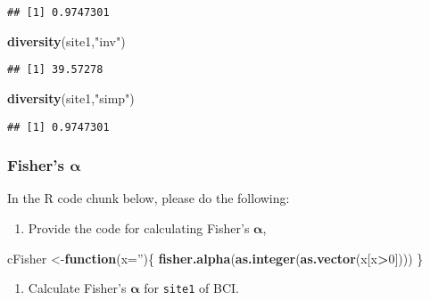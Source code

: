 \documentclass[
]{article}
\newenvironment{Shaded}{\begin{snugshade}}{\end{snugshade}}
\newcommand{\ControlFlowTok}[1]{\textcolor[rgb]{0.13,0.29,0.53}{\textbf{#1}}}
\newcommand{\DataTypeTok}[1]{\textcolor[rgb]{0.13,0.29,0.53}{#1}}
\newcommand{\DecValTok}[1]{\textcolor[rgb]{0.00,0.00,0.81}{#1}}
\newcommand{\KeywordTok}[1]{\textcolor[rgb]{0.13,0.29,0.53}{\textbf{#1}}}
\newcommand{\NormalTok}[1]{#1}
\newcommand{\OperatorTok}[1]{\textcolor[rgb]{0.81,0.36,0.00}{\textbf{#1}}}
\newcommand{\StringTok}[1]{\textcolor[rgb]{0.31,0.60,0.02}{#1}}
\providecommand{\tightlist}{%
  \setlength{\itemsep}{0pt}\setlength{\parskip}{0pt}}
\begin{document}
\begin{verbatim}
## [1] 0.9747301
\end{verbatim}

\begin{Shaded}
\begin{Highlighting}[]
\KeywordTok{diversity}\NormalTok{(site1,}\StringTok{"inv"}\NormalTok{)}
\end{Highlighting}
\end{Shaded}

\begin{verbatim}
## [1] 39.57278
\end{verbatim}

\begin{Shaded}
\begin{Highlighting}[]
\KeywordTok{diversity}\NormalTok{(site1,}\StringTok{"simp"}\NormalTok{)}
\end{Highlighting}
\end{Shaded}

\begin{verbatim}
## [1] 0.9747301
\end{verbatim}

\hypertarget{fishers-boldsymbolalpha}{%
\subsubsection{\texorpdfstring{Fisher's
\(\boldsymbol\alpha\)}{Fisher's \textbackslash{}boldsymbol\textbackslash{}alpha}}\label{fishers-boldsymbolalpha}}

In the R code chunk below, please do the following:

\begin{enumerate}
\def\labelenumi{\arabic{enumi}.}
\tightlist
\item
  Provide the code for calculating Fisher's \(\boldsymbol\alpha\),
\end{enumerate}

\begin{Shaded}
\begin{Highlighting}[]
\NormalTok{cFisher <-}\ControlFlowTok{function}\NormalTok{(}\DataTypeTok{x=}\StringTok{''}\NormalTok{)\{}
  \KeywordTok{fisher.alpha}\NormalTok{(}\KeywordTok{as.integer}\NormalTok{(}\KeywordTok{as.vector}\NormalTok{(x[x}\OperatorTok{>}\DecValTok{0}\NormalTok{])))}
\NormalTok{\}}
\end{Highlighting}
\end{Shaded}

\begin{enumerate}
\def\labelenumi{\arabic{enumi}.}
\setcounter{enumi}{1}
\tightlist
\item
  Calculate Fisher's \(\boldsymbol\alpha\) for \texttt{site1} of BCI.
\end{enumerate}
\end{document}
